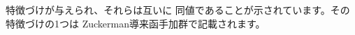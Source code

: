 \documentclass[notheorems]{beamer}
\newcommand{\nin}{\not\in}
\theoremstyle{definition}
\theoremstyle{example}
\theoremstyle{remark}
\theoremstyle{mystyle}
\begin{document}
\begin{frame}{}
{特徴づけが与えら{れ}、それらは互いに
同値であることが示されています。その特徴づけの1つは
Zuckerman導来函手加群で記載されます。
}
\end{frame}
\end{document}
